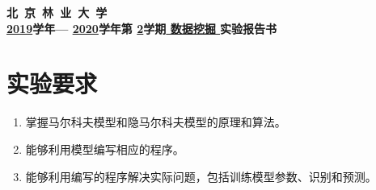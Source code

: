\documentclass[12pt,AutoFakeBold,a4paper]{article}
\begin{document}
\begin{center}
		{\heiti{} {\bfseries 北\ 京\ 林\ 业\ 大\ 学} }\\[15pt]
		{\heiti{} {\bfseries \underline{2019}学年— \underline{2020}学年第 \underline{2}学期\underline{  数据挖掘  }实验报告书 }}
	\end{center}
	\heiti{}
	\begin{center}
		\hspace*{2cm}
	\end{center}
	\begin{center}
		\hspace*{2cm}
	\end{center}
	\begin{center}
	\hspace*{2cm}
\end{center}
\begin{center}
\end{center}
\begin{center}
\end{center}

%
%
\songti {}
\section{实验要求}
\begin{enumerate}
\item 掌握马尔科夫模型和隐马尔科夫模型的原理和算法。
\item 能够利用模型编写相应的程序。
\item 能够利用编写的程序解决实际问题，包括训练模型参数、识别和预测。
\end{enumerate}
\end{document}

